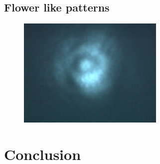 \documentclass[aps,twocolumn,secnumarabic,balancelastpage,amsmath,amssymb,nofootinbib]{revtex4}
\begin{document}
\subsection{Flower like patterns}
\begin{figure}
  \includegraphics[width=7cm]{cone.png}
  \caption{}
  \label{cone}
\end{figure}
\begin{figure}
  \caption{}
  \label{patterns}
\end{figure}

\section{Conclusion}


\end{document}
